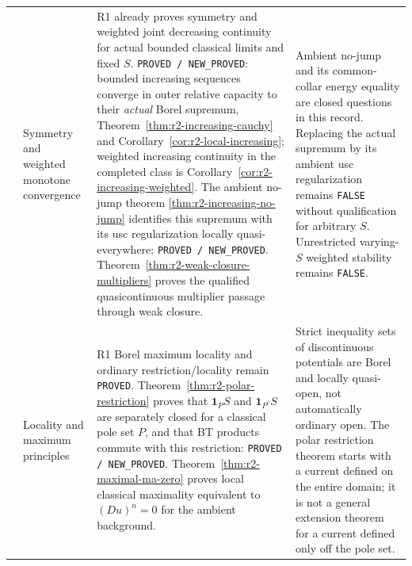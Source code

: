 \documentclass[11pt,a4paper]{article}
\numberwithin{equation}{section}
\theoremstyle{definition}
\theoremstyle{remark}
\begin{document}
\begin{longtable}{@{}>{\raggedright\arraybackslash}p{}>{\raggedright\arraybackslash}p{}>{\raggedright\arraybackslash}p{}>{\raggedright\arraybackslash}p{}@{}}
4 & Symmetry and weighted monotone convergence &
R1 already proves symmetry and weighted joint decreasing continuity
for actual bounded classical limits and fixed $S$.
\texttt{PROVED / NEW\_PROVED}: bounded increasing sequences converge
in outer relative capacity to their \emph{actual} Borel supremum,
Theorem~\ref{thm:r2-increasing-cauchy} and
Corollary~\ref{cor:r2-local-increasing}; weighted increasing continuity
in the completed class is Corollary~\ref{cor:r2-increasing-weighted}.
The ambient no-jump theorem
\ref{thm:r2-increasing-no-jump} identifies this supremum with its usc
regularization locally quasi-everywhere:
\texttt{PROVED / NEW\_PROVED}.
Theorem~\ref{thm:r2-weak-closure-multipliers} proves the qualified
quasicontinuous multiplier passage through weak closure. &
Ambient no-jump and its common-collar energy equality are closed
questions in this record. Replacing the actual supremum by its
ambient usc regularization remains \texttt{FALSE} without
qualification for arbitrary $S$. Unrestricted varying-$S$ weighted
stability remains \texttt{FALSE}.\\[5pt]

5 & Locality and maximum principles &
R1 Borel maximum locality and ordinary restriction/locality remain
\texttt{PROVED}. Theorem~\ref{thm:r2-polar-restriction} proves that
$\mathbf1_P S$ and $\mathbf1_{P^c}S$ are separately closed for a
classical pole set $P$, and that BT products commute with this
restriction: \texttt{PROVED / NEW\_PROVED}.
Theorem~\ref{thm:r2-maximal-ma-zero} proves local classical maximality
equivalent to $(Du)^n=0$ for the ambient background. &
Strict inequality sets of discontinuous potentials are Borel and
locally quasi-open, not automatically ordinary open. The polar
restriction theorem starts with a current defined on the entire
domain; it is not a general extension theorem for a current defined
only off the pole set.\\[5pt]


\end{longtable}
\end{document}
